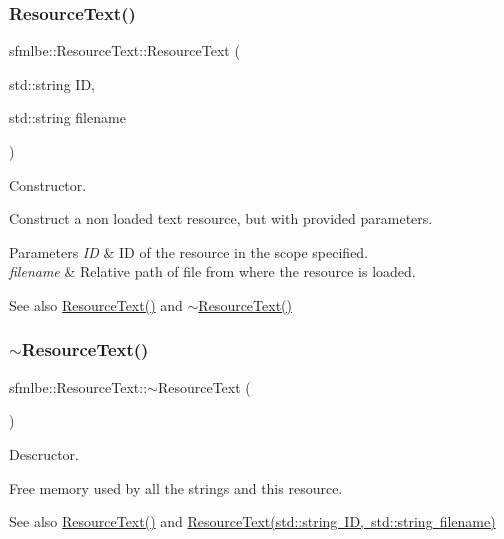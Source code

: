 \subsubsection{\texorpdfstring{Resource\+Text()}{ResourceText()}\hspace{0.1cm}{\footnotesize\ttfamily [2/2]}}
{\footnotesize\ttfamily sfmlbe\+::\+Resource\+Text\+::\+Resource\+Text (\begin{DoxyParamCaption}\item[{std\+::string}]{ID,  }\item[{std\+::string}]{filename }\end{DoxyParamCaption})}



Constructor. 

Construct a non loaded text resource, but with provided parameters. 
\begin{DoxyParams}{Parameters}
{\em ID} & ID of the resource in the scope specified. \\
\hline
{\em filename} & Relative path of file from where the resource is loaded. \\
\hline
\end{DoxyParams}
\begin{DoxySeeAlso}{See also}
\mbox{\hyperlink{classsfmlbe_1_1_resource_text_aaf976bc4d8e514a621239ab3ef61b294}{Resource\+Text()}} and \mbox{\hyperlink{classsfmlbe_1_1_resource_text_a037b1bd5ac566301358ee5cd75a4cd00}{$\sim$\+Resource\+Text()}} 
\end{DoxySeeAlso}
\mbox{\label{classsfmlbe_1_1_resource_text_a037b1bd5ac566301358ee5cd75a4cd00}} 
\subsubsection{\texorpdfstring{$\sim$\+Resource\+Text()}{~ResourceText()}}
{\footnotesize\ttfamily sfmlbe\+::\+Resource\+Text\+::$\sim$\+Resource\+Text (\begin{DoxyParamCaption}{ }\end{DoxyParamCaption})}



Descructor. 

Free memory used by all the strings and this resource. \begin{DoxySeeAlso}{See also}
\mbox{\hyperlink{classsfmlbe_1_1_resource_text_aaf976bc4d8e514a621239ab3ef61b294}{Resource\+Text()}} and \mbox{\hyperlink{classsfmlbe_1_1_resource_text_a05e07dcbb416cee62e4060627a76c749}{Resource\+Text(std\+::string I\+D, std\+::string filename)}} 
\end{DoxySeeAlso}


